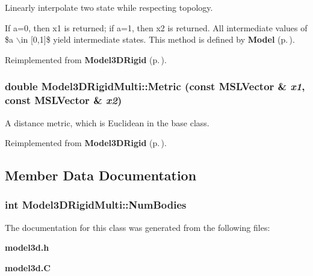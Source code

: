 Linearly interpolate two state while respecting topology.

If a=0, then x1 is returned; if a=1, then x2 is returned. All intermediate values of \$a $\backslash$in [0,1]\$ yield intermediate states. This method is defined by {\bf Model} {\rm (p.\,\pageref{classModel})}. 

Reimplemented from {\bf Model3DRigid} {\rm (p.\,\pageref{classModel3DRigid_a5})}.
\subsubsection{\setlength{\rightskip}{0pt plus 5cm}double Model3DRigid\-Multi::Metric (const {\bf MSLVector} \& {\em x1}, const {\bf MSLVector} \& {\em x2})\hspace{0.3cm}{\tt  [virtual]}}\label{classModel3DRigidMulti_a2}


A distance metric, which is Euclidean in the base class.



Reimplemented from {\bf Model3DRigid} {\rm (p.\,\pageref{classModel3DRigid_a4})}.

\subsection{Member Data Documentation}
\subsubsection{\setlength{\rightskip}{0pt plus 5cm}int Model3DRigid\-Multi::Num\-Bodies}\label{classModel3DRigidMulti_m0}




The documentation for this class was generated from the following files:\begin{CompactItemize}
\item 
{\bf model3d.h}\item 
{\bf model3d.C}\end{CompactItemize}
